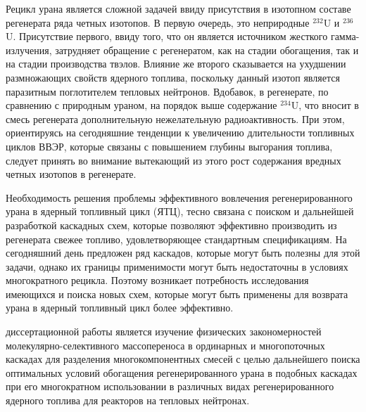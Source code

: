 Рецикл урана является сложной задачей ввиду присутствия в изотопном составе регенерата ряда четных изотопов. В первую очередь, это неприродные $^{232}$U и $^{236}$U. Присутствие первого, ввиду того, что он является источником жесткого гамма-излучения, затрудняет обращение с регенератом, как на стадии обогащения, так и на стадии производства твэлов. Влияние же второго сказывается на ухудшении размножающих свойств ядерного топлива, поскольку данный изотоп является паразитным поглотителем тепловых нейтронов. Вдобавок, в регенерате, по сравнению с природным ураном, на порядок выше содержание $^{234}$U, что вносит в смесь регенерата дополнительную нежелательную радиоактивность. При этом, ориентируясь на сегодняшние тенденции к увеличению длительности топливных циклов ВВЭР, которые связаны с повышением глубины выгорания топлива, следует принять во внимание вытекающий из этого рост содержания вредных четных изотопов в регенерате.

Необходимость решения проблемы эффективного вовлечения регенерированного урана в ядерный топливный цикл (ЯТЦ), тесно связана с поиском и дальнейшей разработкой каскадных схем, которые позволяют эффективно производить из регенерата свежее топливо, удовлетворяющее стандартным спецификациям.
На сегодняшний день предложен ряд каскадов, которые могут быть полезны для этой задачи, однако их границы применимости могут быть недостаточны в условиях многократного рецикла. Поэтому возникает потребность исследования имеющихся и поиска новых схем, которые могут быть применены для возврата урана в ядерный топливный цикл более эффективно. 


{\aim} диссертационной работы является изучение физических закономерностей
молекулярно-селективного массопереноса в ординарных и многопоточных каскадах
для разделения многокомпонентных смесей с целью дальнейшего поиска
оптимальных условий обогащения регенерированного урана в подобных каскадах при
его многократном использовании в различных видах регенерированного ядерного
топлива для реакторов на тепловых нейтронах. 

